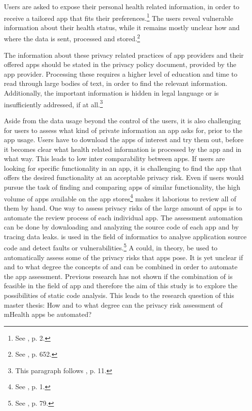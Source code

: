\documentclass[
	a4paper,
	oneside,
	12pt,
	liststotocnumbered
]{article}
\let\cite\textcite
\begin{document}
Users are asked to expose their personal health related information, in order to receive a tailored app that fits their preferences.\footnote{See \cite{Chen2012}, p. 2.}
The users reveal vulnerable information about their health status, while it remains mostly unclear how and where the data is sent, processed and stored.\footnote{See \cite{He2014}, p. 652.}

The information about these privacy related practices of app providers and their offered apps should be stated in the privacy policy document, provided by the app provider.
Processing these \pps requires a higher level of education and time to read through large bodies of text, in order to find the relevant information. 
Additionally, the important information is hidden in legal language or is  insufficiently addressed, if at all.\footnote{This paragraph follows \cite{Dehling2014}, p. 11.}

Aside from the data usage beyond the control of the users, it is also challenging for users to assess what kind of private information an app asks for, prior to the app usage. 
Users have to download the apps of interest and try them out, before it becomes clear what health related information is processed by the app and in what way. 
This leads to low inter comparability between apps. 
If users are looking for specific functionality in an \mH app, it is challenging to find the app that offers the desired functionality at an acceptable privacy risk. 
Even if users would pursue the task of finding and comparing \mH apps of similar functionality, the high volume of apps available on the app stores\footnote{See \cite{Enck2011}, p. 1.} makes it laborious to review all of them by hand.
One way to assess privacy risks of the large amount of \mH apps is to automate the review process of each individual app. 
The assessment automation can be done by downloading and analyzing the source code of each app and by tracing data leaks. 
\Sca is used in the field of informatics to analyse application source code and detect faults or vulnerabilities.\footnote{See \cite{Baca2008}, p. 79.} 
A \sca could, in theory, be used to automatically assess some of the privacy risks that \mH apps pose.
It is yet unclear if and to what degree the concepts of \sca and \pra can be combined in order to automate the app assessment.
Previous research has not shown if the combination of \sca is feasible in the field of \mH app \pra and therefore the aim of this study is to explore the possibilities of static code analysis. 
This leads to the research question of this master thesis: How and to what degree can the privacy risk assessment of mHealth apps be automated?
\end{document}
